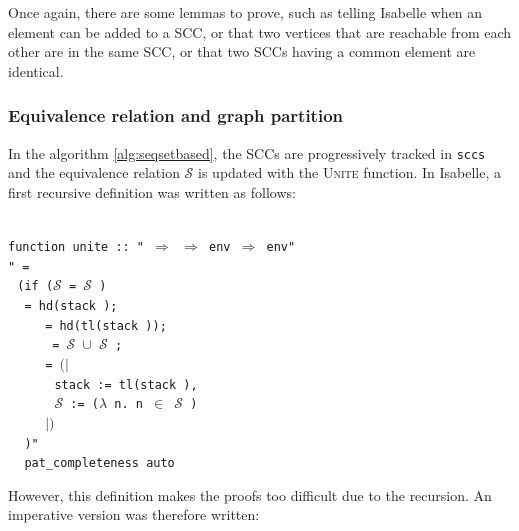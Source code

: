 \documentclass[a4 paper, 12pt]{article}
\newcommand{\where}{{\color{isa_green}{where}}}
\newcommand{\generic}[1]{{\color{isa_purple}{\textquotesingle#1}}}
\newcommand{\isa}[1]{\small\texttt{\\\noindent#1}}
\newcommand{\blue}[1]{{\color{isa_dark_blue}{#1}}}
\newcommand{\bblue}[1]{{\color{isa_blue}{#1}}}
\newcommand{\green}[1]{{\color{isa_dark_green}{#1}}}
\newcommand{\env}[1]{$(\!|$#1$|\!)$}
\theoremstyle{definition}
\begin{document}
Once again, there are some lemmas to prove, such as telling Isabelle when an element can be added to a SCC, or that two vertices that are reachable from each other are in the same SCC, or that two SCCs having a common element are identical.\\


\subsubsection{Equivalence relation and graph partition}
In the algorithm \ref{alg:seqsetbased}, the SCCs are progressively tracked in \texttt{sccs} and the equivalence relation $\mathcal{S}$ is updated with the \textsc{Unite} function. In Isabelle, a first recursive definition was written as follows:

\isa{
    {\color{isa_blue}function} unite :: "\generic{v} $\Rightarrow$ \generic{v} $\Rightarrow$ \generic{v} env $\Rightarrow$ \generic{v} env" \where{}\\
    "\blue{unite} \green{v w e} =\\
    $~~~$({\color{isa_blue}if} ($\mathcal{S}$ \green{e v} = $\mathcal{S}$ \green{e w}) \bblue{then} \green{e}\\
    $~~~$\bblue{else let} \green{r} = hd(stack \green{e});\\
    $~~~~~~~~~~~~$\green{r'}= hd(tl(stack \green{e}));\\
    $~~~~~~~~~~~~$\green{joined} = $\mathcal{S}$ \green{e r} $\cup$ $\mathcal{S}$ \green{e r};\\
    $~~~~~~~~~~~~$\green{e'}= \green{e}\env{\\
    $~~~~~~~~~~~~~~~$stack := tl(stack \green{e}),\\
    $~~~~~~~~~~~~~~~\mathcal{S}$ := ($\lambda$ n. \bblue{if} n $\in$ \green{joined} \bblue{then} \green{joined} \bblue{else} $\mathcal{S}$ \green{e n})\\
    $~~~~~~~~~~~~$}\\
    $~~~$\bblue{in} \blue{unite} \green{v w e'})"\\
    $~~~$\bblue{by} pat\_completeness auto
}

\BlankLine

However, this definition makes the proofs too difficult due to the recursion. An imperative version was therefore written:
\end{document}
